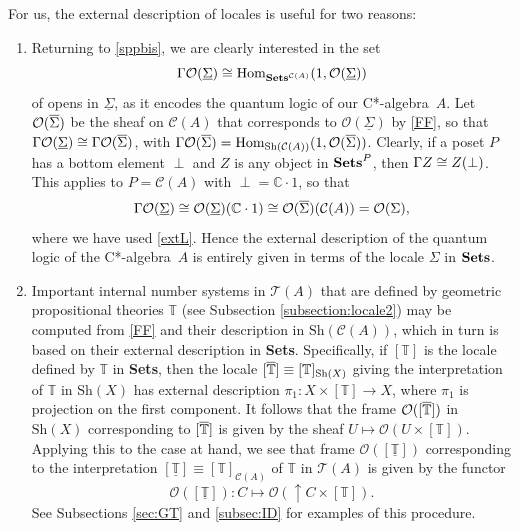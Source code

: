 \documentclass[11pt]{article}
\newcommand{\beq}{\begin{equation}}
\newcommand{\eeq}{\end{equation}}
\newcommand{\Sets}{\mbox{\textbf{Sets}}}
\newcommand{\ca}{C*-algebra} \newcommand{\jba}{JB-algebra}
\newcommand{\raw}{\rightarrow} \newcommand{\rat}{\mapsto}
\newcommand{\x}{\times} \newcommand{\hb}{\hbar}
\newcommand{\er}{\eqref}
\newcommand{\Sg}{\Sigma} \newcommand{\ta}{\tau} \newcommand{\ph}{\phi}
\newcommand{\CA}{{\mathcal A}} \newcommand{\CB}{{\mathcal B}}
\newcommand{\CO}{{\mathcal O}} \newcommand{\CP}{{\mathcal P}}
\newcommand{\C}{{\mathbb C}} \newcommand{\D}{{\mathbb D}}
\newcommand{\T}{{\mathbb T}} \newcommand{\Z}{{\mathbb Z}}
\newcommand{\Hom}{\mbox{\rm Hom}}
\newcommand{\alg}[1]{\ensuremath{#1}}
\newcommand{\functor}[1]{\ensuremath{\underline{#1}}}
\newcommand{\Sh}{\ensuremath{\mathrm{Sh}}}
\newcommand{\context}{\ensuremath{\mathcal{C}}}
\newcommand{\asstopos}{\ensuremath{\mathcal{T}}}
\renewcommand{\CA}{\mathcal{C}(A)}
\newcommand{\TA}{\mathcal{T}(A)}
\newcommand{\ulS}{\functor{\Sigma}}
\renewcommand{\TA}{\asstopos(\alg{A})}
\renewcommand{\CA}{\context(\alg{A})}
\begin{document}
For us, the external description of locales is useful for  two reasons:
\begin{enumerate}
\item Returning to \er{sppbis}, we are clearly interested in the set
$$\Gm\CO(\ulS)\cong \Hom_{\mathbf{Sets}^{\mathcal{C}(A)}}(1,\CO(\ulS))$$ of opens in
$\ulS$, as it encodes the quantum logic of our \ca\ $A$. Let  $\CO(\ovl{\Sg})$ be the
sheaf on $\mathcal{C}(A)$ that corresponds to
$\CO(\ulS)$ by \er{FF}, so that $\Gm\CO(\ulS)\cong \Gm\CO(\ovl{\Sg})$, with
$\Gm\CO(\ovl{\Sg})=\Hom_{\Sh(\mathcal{C}(A))}(1,\CO(\ovl{\Sg}))
$. Clearly, if a poset $P$ has a bottom element $\perp$ and $Z$ is any object in
$\Sets^P$, then $\Gamma Z \cong Z(\perp)$. This applies to $P=\mathcal{C}(A)$ with
$\perp=\C\cdot 1$, so that
\beq \Gm\CO(\ulS)\cong \CO(\ulS)(\C\cdot 1)\cong
\CO(\ovl{\Sg})(\mathcal{C}(A))=\CO(\Sigma),\label{eq8}\eeq
where we have used \er{extL}.
Hence the external description of the quantum logic of the \ca\ $A$ is entirely
given in terms
of the locale $\Sigma$ in $\Sets$.
\item Important internal number systems in $\TA$ that are defined by   geometric propositional theories $\T$
(see  Subsection \ref{subsection:locale2})
may be computed from \er{FF} and their description in $\Sh(\CA)$, which in turn is based on their external
 description  in \Sets. Specifically, if  $[\T]$ is the locale defined by $\T$ in \Sets, then the locale $[\ovl{\T}]\equiv [\T]_{\Sh(X)}$ 
 giving the interpretation of
 $\T$ in $\Sh(X)$ has external description $\pi_1: X\x [\T]\raw X$, where $\pi_1$ is projection on the first component.
 It follows that the frame $\CO([\ovl{\T}])$ in $\Sh(X)$ corresponding to $[\ovl{\T}]$ is given by the sheaf
 $U\mapsto \CO(U\x[\T])$. Applying this to the case at hand, we see that frame $\CO([\underline{\T}])$ corresponding to
 the interpretation $[\underline{\T}]\equiv [\T]_{\CA}$ of $\T$ in $\TA$ is given by the functor
 \beq \CO([\underline{\T}]): C\mapsto \CO(\uparrow\! C \x [\T]). \label{intT}\eeq
 See Subsections \ref{sec:GT} and \ref{subsec:ID} for examples of this procedure.
\end{enumerate}
\end{document}
